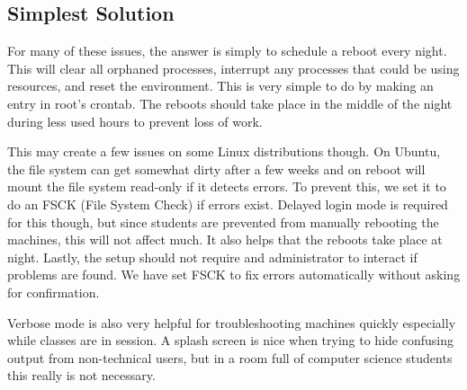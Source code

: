 \subsection{Simplest Solution}
For many of these issues, the answer is simply to schedule a reboot every night.  This will clear all orphaned processes, interrupt any processes that could be using resources, and reset the environment.  This is very simple to do by making an entry in root's crontab.  The reboots should take place in the middle of the night during less used hours to prevent loss of work.  

This may create a few issues on some Linux distributions though.  On Ubuntu, the file system can get somewhat dirty after a few weeks and on reboot will mount the file system read-only if it detects errors.  To prevent this, we set it to do an FSCK (File System Check) if errors exist.  Delayed login mode is required for this though, but since students are prevented from manually rebooting the machines, this will not affect much.  It also helps that the reboots take place at night.  Lastly, the setup should not require and administrator to interact if problems are found.  We have set FSCK to fix errors automatically without asking for confirmation.  

Verbose mode is also very helpful for troubleshooting machines quickly especially while classes are in session.  A splash screen is nice when trying to hide confusing output from non-technical users, but in a room full of computer science students this really is not necessary.  
